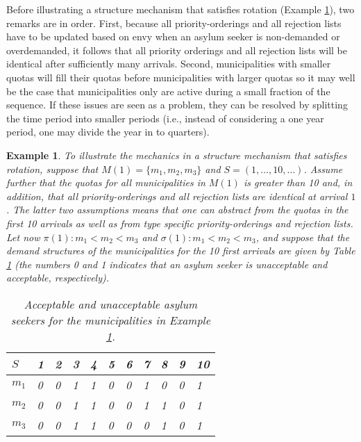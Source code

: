 \documentclass[12pt,fleqn]{article}
\newtheorem{example}{Example}
\begin{document}
\noindent Before illustrating a structure mechanism that satisfies rotation (Example \ref{EX:Mechanism}), two remarks are in order. First, because all priority-orderings and all rejection lists have to be updated based on envy when an asylum seeker is non-demanded or overdemanded, it follows that all priority orderings and all rejection lists will be identical after sufficiently many arrivals. Second, municipalities with smaller quotas will fill their quotas before municipalities with larger quotas so it may well be the case that municipalities only are active during a small fraction of the sequence. If these issues are seen as a problem, they can be resolved by splitting the time period into smaller periods (i.e., instead of considering a one year period, one may divide the year in to quarters).
\begin{example}\rm\label{EX:Mechanism}
To illustrate the mechanics in a structure mechanism that satisfies rotation, suppose that $M(1)=\{m_1,m_2,m_3\}$ and $S=(1,\ldots,10,\ldots)$. Assume further that the quotas for all municipalities in $M(1)$ is greater than 10 and, in addition, that all priority-orderings and all rejection lists are identical at arrival $1$. The latter two assumptions means that one can abstract from the quotas in the first 10 arrivals as well as from type specific priority-orderings and rejection lists. Let now $\pi(1): m_1<m_2<m_3$ and $\sigma(1): m_1<m_2<m_3$, and suppose that the demand structures of the municipalities for the 10 first arrivals are given by Table \ref{TABLE:Demand} (the numbers 0 and 1 indicates that an asylum seeker is unacceptable and acceptable, respectively).
 
\begin{table}[h!]
\caption{Acceptable and unacceptable asylum seekers for the municipalities in Example \ref{TABLE:Demand}.}\label{TABLE:Demand}
\begin{tabular}{lllllllllll}\hline
$S$   & 1 & 2 & 3 & 4 & 5 & 6 & 7 & 8 & 9 & 10 \\ \hline
$m_1$ & 0 & 0 & 1 & 1 & 0 & 0 & 1 & 0 & 0 & 1\\
$m_2$ & 0 & 0 & 1 & 1 & 0 & 0 & 1 & 1 & 0 & 1\\
$m_3$ & 0 & 0 & 1 & 1 & 0 & 0 & 0 & 1 & 0 & 1\\ \hline
\end{tabular}
\end{table}


\end{example}
\end{document}
